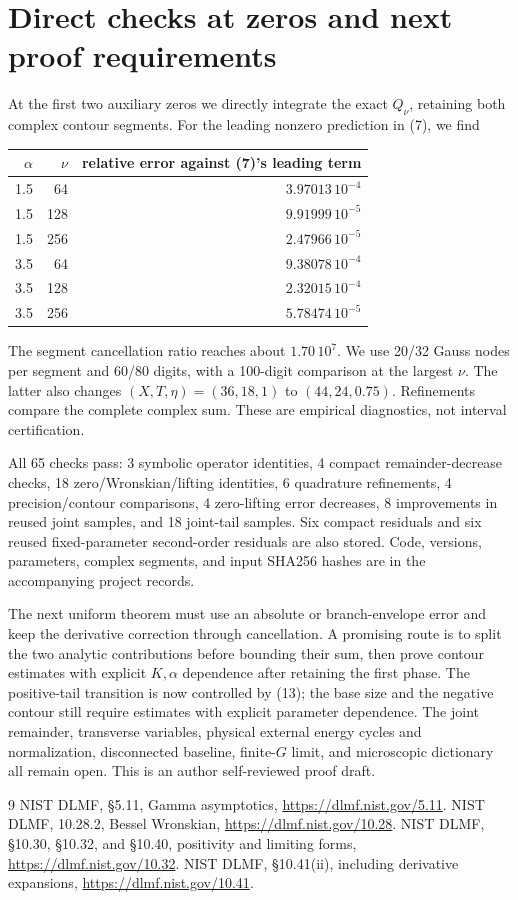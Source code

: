 \documentclass[11pt,a4paper]{article}
\begin{document}
\newpage
\section{Direct checks at zeros and next proof requirements}
At the first two auxiliary zeros we directly integrate the exact
\(Q_\nu\), retaining both complex contour segments.
For the leading nonzero prediction in (7), we find
\begin{center}\begin{tabular}{rrr}\toprule
\(\alpha\)&\(\nu\)&relative error against (7)'s leading term\\\midrule
1.5&64&\(3.97013\,10^{-4}\)\\
1.5&128&\(9.91999\,10^{-5}\)\\
1.5&256&\(2.47966\,10^{-5}\)\\
3.5&64&\(9.38078\,10^{-4}\)\\
3.5&128&\(2.32015\,10^{-4}\)\\
3.5&256&\(5.78474\,10^{-5}\)\\\bottomrule
\end{tabular}\end{center}
The segment cancellation ratio reaches about \(1.70\,10^7\).
We use 20/32 Gauss nodes per segment and 60/80 digits, with a
100-digit comparison at the largest \(\nu\).
The latter also changes \((X,T,\eta)=(36,18,1)\) to
\((44,24,0.75)\). Refinements compare the complete complex sum.
These are empirical diagnostics, not interval certification.

All 65 checks pass: 3 symbolic operator identities, 4 compact
remainder-decrease checks, 18 zero/Wronskian/lifting identities,
6 quadrature refinements, 4 precision/contour comparisons,
4 zero-lifting error decreases, 8 improvements in reused joint
samples, and 18 joint-tail samples.
Six compact residuals and six reused fixed-parameter
second-order residuals are also stored.
Code, versions, parameters, complex segments, and input SHA256
hashes are in the accompanying project records.

The next uniform theorem must use an absolute or branch-envelope
error and keep the derivative correction through cancellation.
A promising route is to split the two analytic contributions before
bounding their sum, then prove contour estimates with explicit
\(K,\alpha\) dependence after retaining the first phase.
The positive-tail transition is now controlled by (13); the base
size and the negative contour still require estimates with explicit
parameter dependence.
The joint remainder, transverse variables, physical external energy
cycles and normalization, disconnected baseline, finite-\(G\) limit,
and microscopic dictionary all remain open.
This is an author self-reviewed proof draft.

\begin{thebibliography}{9}
 NIST DLMF, \S5.11, Gamma asymptotics,
\url{https://dlmf.nist.gov/5.11}.
 NIST DLMF, 10.28.2, Bessel Wronskian,
\url{https://dlmf.nist.gov/10.28}.
 NIST DLMF, \S10.30, \S10.32, and \S10.40,
positivity and limiting forms,
\url{https://dlmf.nist.gov/10.32}.
 NIST DLMF, \S10.41(ii), including derivative expansions,
\url{https://dlmf.nist.gov/10.41}.
\end{thebibliography}
\end{document}

